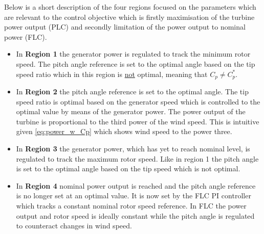 Below is a short description of the four regions focused on the parameters which are relevant to the control objective which is firstly maximisation of the turbine power output (PLC) and secondly limitation of the power output to nominal power (FLC).
\begin{itemize}
	\item In \textbf{Region 1} the generator power is regulated to track the minimum rotor speed. The pitch angle reference is set to the optimal angle based on the tip speed ratio which in this region is \underline{not} optimal, meaning that $ C_p \neq C_p^* $. 
	\item In \textbf{Region 2} the pitch angle reference is set to the optimal angle. The tip speed ratio is optimal based on the generator speed which is controlled to the optimal value by means of the generator power. The power output of the turbine is proportional to the third power of the wind speed. This is intuitive given \cref{eq:power_w_Cp} which shows wind speed to the power three.
	\item In \textbf{Region 3} the generator power, which has yet to reach nominal level, is regulated to track the maximum rotor speed. Like in region 1 the pitch angle is set to the optimal angle based on the tip speed which is not optimal.
	\item In \textbf{Region 4} nominal power output is reached and the pitch angle reference is no longer set at an optimal value. It is now set by the FLC PI controller which tracks a constant nominal rotor speed reference. In FLC the power output and rotor speed is ideally constant while the pitch angle is regulated to counteract changes in wind speed.
\end{itemize}



